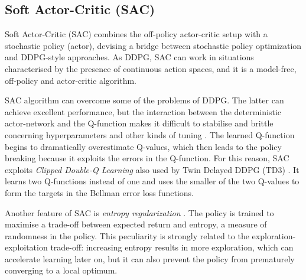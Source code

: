 %		
%		

\subsection{Soft Actor-Critic (SAC)} \label{sac}

Soft Actor-Critic (SAC) \cite{haarnoja2018soft, haarnoja2018alg} combines the off-policy actor-critic setup with a stochastic policy (actor), devising a bridge between stochastic policy optimization and DDPG-style approaches.
As DDPG, SAC can work in situations characterised by the presence of continuous action spaces, and it is a model-free, off-policy and actor-critic algorithm.

SAC algorithm can overcome some of the problems of DDPG.
The latter can achieve excellent performance, but the interaction between the deterministic actor-network and the Q-function makes it difficult to stabilise and brittle concerning hyperparameters and other kinds of tuning \cite{duan2016benchmarking,henderson2018deep}. The learned Q-function begins to dramatically overestimate Q-values, which then leads to the policy breaking because it exploits the errors in the Q-function. For this reason, SAC exploits \textit{Clipped Double-Q Learning} also used by Twin Delayed DDPG (TD3) \cite{fujimoto2018addressing}. It learns two Q-functions instead of one and uses the smaller of the two Q-values to form the targets in the Bellman error loss functions.

Another feature of SAC is \textit{entropy regularization} \cite{ziebart2008maximum, toussaint2009robot, rawlik2013stochastic, fox2015taming, haarnoja2017reinforcement}. The policy is trained to maximise a trade-off between expected return and entropy, a measure of randomness in the policy. This peculiarity is strongly related to the exploration-exploitation trade-off: increasing entropy results in more exploration, which can accelerate learning later on, but it can also prevent the policy from prematurely converging to a local optimum.


